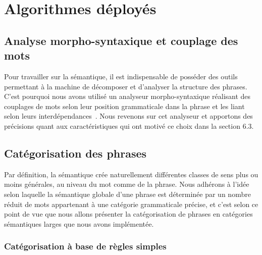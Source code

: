 \documentclass[10pt,a4paper]{article}
\begin{document}


\section{Algorithmes déployés}\label{details}
\subsection{Analyse morpho-syntaxique et couplage des mots}
\par Pour travailler sur la sémantique, il est indispensable de posséder des outils permettant à la machine de décomposer et d'analyser la structure des phrases. C'est pourquoi nous avons utilisé un analyseur morpho-syntaxique réalisant des couplages de mots selon leur position grammaticale dans la phrase et les liant selon leurs interdépendances~\cite{linkgrammar:paper}. Nous revenons sur cet analyseur et apportons des précisions quant aux caractéristiques qui ont motivé ce choix dans la section 6.3.

\subsection{Catégorisation des phrases}
\par Par définition, la sémantique crée naturellement différentes classes de sens plus ou moins générales, au niveau du mot comme de la phrase. Nous adhérons à l'idée selon laquelle la sémantique globale d'une phrase est déterminée par un nombre réduit de mots appartenant à une catégorie grammaticale précise, et c'est selon ce point de vue que nous allons présenter la catégorisation de phrases en catégories sémantiques larges que nous avons implémentée.
\subsubsection{Catégorisation à base de règles simples}
\end{document}
